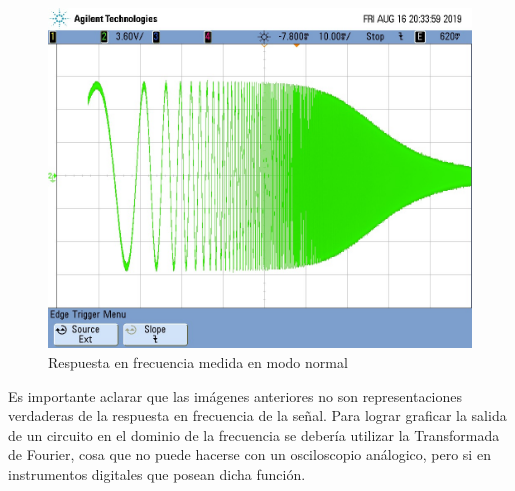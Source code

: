 \begin{figure}[H]
	\begin{center}
		\includegraphics[scale=0.3]{../Mediciones/Fotos/bode_normal.jpg}
	\end{center}
	\caption{Respuesta en frecuencia medida en modo normal}
	\label{fig:bode_normal}
\end{figure}

Es importante aclarar que las imágenes anteriores no son representaciones verdaderas de la respuesta en frecuencia de la señal. Para lograr graficar la salida de un circuito en el dominio de la frecuencia se debería utilizar la Transformada de Fourier, cosa que no puede hacerse con un osciloscopio análogico, pero si en instrumentos digitales que posean dicha función.